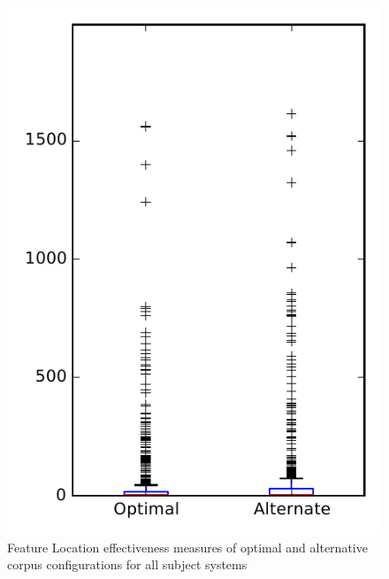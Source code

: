 
\begin{figure}
\centering
\includegraphics[height=0.4\textheight]{figures/combo/flt_rq2_overview}
\caption{Feature Location effectiveness measures of optimal and alternative corpus configurations for all subject systems}
\label{fig:combo:flt:rq2:overview}
\end{figure}
